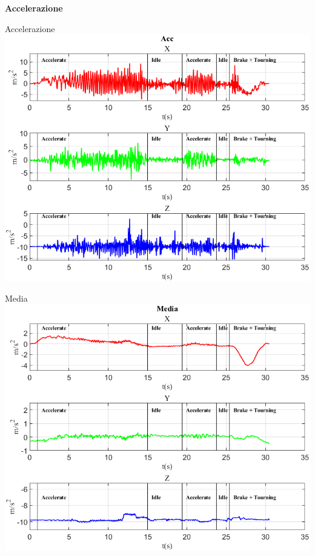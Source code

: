 \documentclass[beamer]{standalone}
\begin{document}
	\begin{frame}
		\color{blue}\centering\Huge{\textbf{Accelerazione}}	
	\end{frame}
	
	\begin{frame}{{Accelerazione}}
		\centering\includegraphics[height=.8\textheight]{figure/Acc/Acc}
	\end{frame}
	
	\begin{frame}{{Media}}
		\centering\includegraphics[height=.8\textheight]{figure/Acc/Media}
	\end{frame}
	
\end{document}
